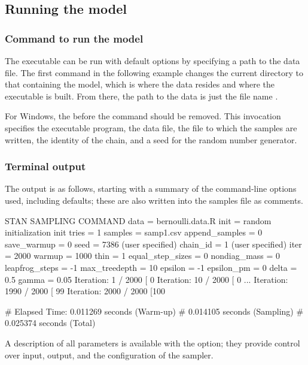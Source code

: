 \documentclass[article]{jss}
\begin{document}
\subsection{Running the model}

\subsubsection{Command to run the model}

The executable can be run with default options by specifying a path to
the data file.  The first command in the following example changes the
current directory to that containing the model, which is where the
data resides and where the executable is built.  From there, the path
to the data is just the file name .
%
\begin{CodeChunk}
{\small
{}
}
\end{CodeChunk}
%
For Windows, the  before the command should be removed.  This
invocation specifies the executable program, the data file, the file
to which the samples are written, the identity of the chain, and a
seed for the random number generator.

\subsubsection{Terminal output}

The output is as follows, starting with a summary of the command-line
options used, including defaults;  these are also written into the 
samples file as comments.
%
\begin{Code}
STAN SAMPLING COMMAND
data = bernoulli.data.R
init = random initialization
init tries = 1
samples = samp1.csv
append_samples = 0
save_warmup = 0
seed = 7386 (user specified)
chain_id = 1 (user specified)
iter = 2000
warmup = 1000
thin = 1
equal_step_sizes = 0
nondiag_mass = 0
leapfrog_steps = -1
max_treedepth = 10
epsilon = -1
epsilon_pm = 0
delta = 0.5
gamma = 0.05
Iteration:    1 / 2000 [  0%
Iteration:   10 / 2000 [  0%
...
Iteration: 1990 / 2000 [ 99%
Iteration: 2000 / 2000 [100%

# Elapsed Time: 0.011269 seconds (Warm-up)
#               0.014105 seconds (Sampling)
#               0.025374 seconds (Total)
\end{Code}
%
A description of all parameters is available with the 
option; they provide control over input, output, and the configuration
of the sampler.
\end{document}
